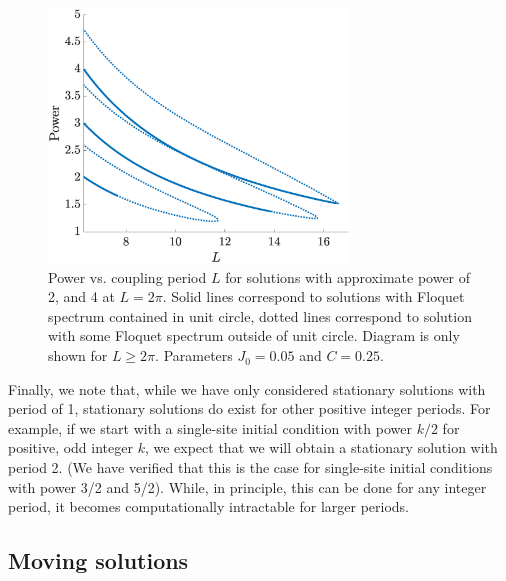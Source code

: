\documentclass[reprint, amsmath,amssymb,aps,pre]{revtex4-2}
\begin{document}
\begin{figure}
    \centering
    \includegraphics[width=8cm]{stat234contL.eps}
    \caption{Power vs. coupling period $L$ for solutions with approximate power of 2, and 4 at $L = 2\pi$. Solid lines correspond to solutions with Floquet spectrum contained in unit circle, dotted lines correspond to solution with some Floquet spectrum outside of unit circle. Diagram is only shown for $L\geq 2\pi$. Parameters $J_0 = 0.05$ and $C=0.25$.}
    \label{fig:statcontL}
\end{figure}

Finally, we note that, while we have only considered stationary solutions with period of 1, stationary solutions do exist for other positive integer periods. For example, if we start with a single-site initial condition with power $k/2$ for positive, odd integer $k$, we expect that we will obtain a stationary solution with period 2. (We have verified that this is the case for single-site initial conditions with power 3/2 and 5/2). While, in principle, this can be done for any integer period, it becomes computationally intractable for larger periods.

\subsection{Moving solutions}
\end{document}
